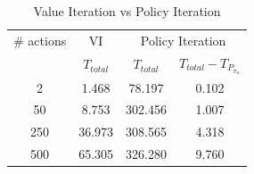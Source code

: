 \begin{table}
\centering
\caption{Value Iteration vs Policy Iteration}
\label{tab:v_vs_p}
\begin{tabular}{|c| c| c| c|}
\hline
\# actions & VI & \multicolumn{2}{|c|}{Policy Iteration} \\ \cline{3-4}
 &  $T_{total} $ & $T_{total}$ & $T_{total} - T_{P_{\pi_u}}$ \\ \hline
2 & 1.468  & 78.197  & 0.102 \\ \hline
50 &  8.753 &  302.456 & 1.007 \\ \hline
250 & 36.973 &  308.565 & 4.318 \\ \hline
500 & 65.305 &  326.280 & 9.760\\
\hline
\end{tabular}
\end{table}

